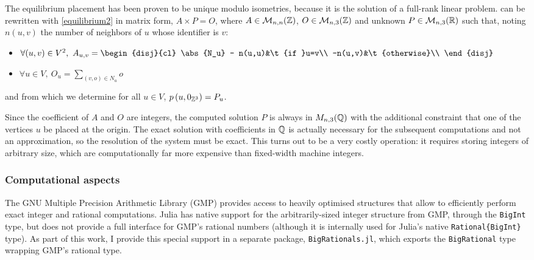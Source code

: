\documentclass[main.tex]{subfiles}
\begin{document}
The equilibrium placement has been proven to be unique modulo isometries, because it is the solution of a full-rank linear problem\autocite{barycentric}.
 can be rewritten with \cref{equilibrium2} in matrix form, $A\times P = O$, where $A\in\mathcal{M}_{n,n}(\mathbb{Z})$, $O\in\mathcal{M}_{n,3}(\mathbb{Z})$ and unknown $P\in\mathcal{M}_{n,3}(\mathbb{R})$ such that, noting $n(u,v)$ the number of neighbors of $u$ whose identifier is $v$:
\begin{itemize}[noitemsep]
	\item $\forall (u,v)\in V^2,\ A_{u,v} = \begin{disj}{cl}
		\abs{N_u} - n(u,u)&\t{if }u=v\\
		-n(u,v)&\t{otherwise}\\
	\end{disj}$%
	\item $\forall u\in V,\ O_u = \sum\limits_{(v,o)\in N_u}o$
\end{itemize}
and from which we determine for all $u\in V$, $p\left(u, 0_{\mathbb{Z}^3}\right) = P_u$.

Since the coefficient of $A$ and $O$ are integers, the computed solution $P$ is always in $M_{n,3}(\mathbb{Q})$ with the additional constraint that one of the vertices $u$ be placed at the origin. The exact solution with coefficients in $\mathbb{Q}$ is actually necessary for the subsequent computations and not an approximation, so the resolution of the system must be exact. This turns out to be a very costly operation: it requires storing integers of arbitrary size, which are computationally far more expensive than fixed-width machine integers.

\subsubsection{Computational aspects}

The GNU Multiple Precision Arithmetic Library (GMP) \autocite{GMP} provides access to heavily optimised structures that allow to efficiently perform exact integer and rational computations. Julia has native support for the arbitrarily-sized integer structure from GMP, through the \texttt{BigInt} type, but does not provide a full interface for GMP's rational numbers (although it is internally used for Julia's native \texttt{Rational\{BigInt\}} type). As part of this work, I provide this special support in a separate package, \texttt{BigRationals.jl}, which exports the \texttt{BigRational} type wrapping GMP's rational type.
\end{document}
